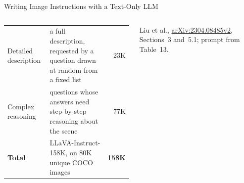 \begin{frame}{Writing Image Instructions with a Text-Only LLM}
\begin{columns}[T,onlytextwidth]
{\begin{tabular}{>{\raggedright\arraybackslash}p{1.65cm} >{\raggedright\arraybackslash}p{3.6cm} r}
        \addlinespace[0.25em]
        Detailed description & a full description, requested by a question drawn at random from a fixed list & 23K \\
        \addlinespace[0.25em]
        Complex reasoning & questions whose answers need step-by-step reasoning about the scene & 77K \\
        \midrule
        \textbf{Total} & LLaVA-Instruct-158K, on 80K unique COCO images & \textbf{158K} \\
        \bottomrule
      \end{tabular}\par}
      \vspace{0.4em}
      {\scriptsize Liu et al., \href{https://arxiv.org/abs/2304.08485v2}{arXiv:2304.08485v2}, Sections~3 and~5.1; prompt from Table~13.\par}
  \end{columns}
\end{frame}

